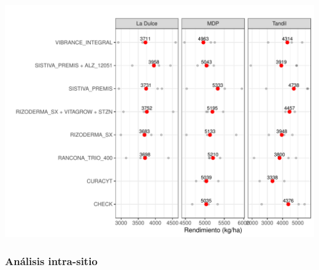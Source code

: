 \documentclass[
  letterpaper,
  DIV=11,
  numbers=noendperiod]{scrreprt}
\begin{document}
\includegraphics{./cura_files/figure-pdf/unnamed-chunk-30-1.pdf}

\hypertarget{anuxe1lisis-intra-sitio}{%
\subsubsection*{Análisis intra-sitio}\label{anuxe1lisis-intra-sitio}}

 
  \providecommand{\huxb}[2]{\arrayrulecolor[RGB]{#1}\global\arrayrulewidth=#2pt}
  \providecommand{\huxvb}[2]{\color[RGB]{#1}\vrule width #2pt}
  \providecommand{\huxtpad}[1]{\rule{0pt}{#1}}
  \providecommand{\huxbpad}[1]{\rule[-#1]{0pt}{#1}}
\end{document}
